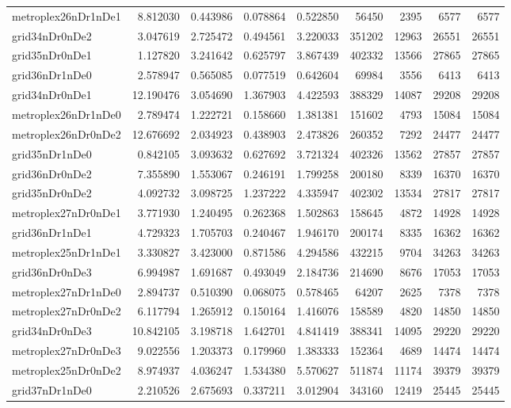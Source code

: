 \begin{longtable}{|l|r|r|r|r|r|r|r|r|}
metroplex26nDr1nDe1 & 8.812030 & 0.443986 & 0.078864 & 0.522850 & 56450 & 2395 & 6577 & 6577 \\
grid34nDr0nDe2 & 3.047619 & 2.725472 & 0.494561 & 3.220033 & 351202 & 12963 & 26551 & 26551 \\
grid35nDr0nDe1 & 1.127820 & 3.241642 & 0.625797 & 3.867439 & 402332 & 13566 & 27865 & 27865 \\
grid36nDr1nDe0 & 2.578947 & 0.565085 & 0.077519 & 0.642604 & 69984 & 3556 & 6413 & 6413 \\
grid34nDr0nDe1 & 12.190476 & 3.054690 & 1.367903 & 4.422593 & 388329 & 14087 & 29208 & 29208 \\
metroplex26nDr1nDe0 & 2.789474 & 1.222721 & 0.158660 & 1.381381 & 151602 & 4793 & 15084 & 15084 \\
metroplex26nDr0nDe2 & 12.676692 & 2.034923 & 0.438903 & 2.473826 & 260352 & 7292 & 24477 & 24477 \\
grid35nDr1nDe0 & 0.842105 & 3.093632 & 0.627692 & 3.721324 & 402326 & 13562 & 27857 & 27857 \\
grid36nDr0nDe2 & 7.355890 & 1.553067 & 0.246191 & 1.799258 & 200180 & 8339 & 16370 & 16370 \\
grid35nDr0nDe2 & 4.092732 & 3.098725 & 1.237222 & 4.335947 & 402302 & 13534 & 27817 & 27817 \\
metroplex27nDr0nDe1 & 3.771930 & 1.240495 & 0.262368 & 1.502863 & 158645 & 4872 & 14928 & 14928 \\
grid36nDr1nDe1 & 4.729323 & 1.705703 & 0.240467 & 1.946170 & 200174 & 8335 & 16362 & 16362 \\
metroplex25nDr1nDe1 & 3.330827 & 3.423000 & 0.871586 & 4.294586 & 432215 & 9704 & 34263 & 34263 \\
grid36nDr0nDe3 & 6.994987 & 1.691687 & 0.493049 & 2.184736 & 214690 & 8676 & 17053 & 17053 \\
metroplex27nDr1nDe0 & 2.894737 & 0.510390 & 0.068075 & 0.578465 & 64207 & 2625 & 7378 & 7378 \\
metroplex27nDr0nDe2 & 6.117794 & 1.265912 & 0.150164 & 1.416076 & 158589 & 4820 & 14850 & 14850 \\
grid34nDr0nDe3 & 10.842105 & 3.198718 & 1.642701 & 4.841419 & 388341 & 14095 & 29220 & 29220 \\
metroplex27nDr0nDe3 & 9.022556 & 1.203373 & 0.179960 & 1.383333 & 152364 & 4689 & 14474 & 14474 \\
metroplex25nDr0nDe2 & 8.974937 & 4.036247 & 1.534380 & 5.570627 & 511874 & 11174 & 39379 & 39379 \\
grid37nDr1nDe0 & 2.210526 & 2.675693 & 0.337211 & 3.012904 & 343160 & 12419 & 25445 & 25445 \\

\end{longtable}

